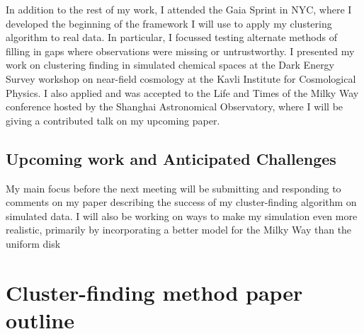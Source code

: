 \documentclass[11pt]{article}
\begin{document}
    In addition to the rest of my work, I attended the Gaia Sprint in NYC, where I developed the beginning of the framework I will use to apply my clustering algorithm to real data. In particular, I focussed testing alternate methods of filling in gaps where observations were missing or untrustworthy. I presented my work on clustering finding in simulated chemical spaces at the Dark Energy Survey workshop on near-field cosmology at the Kavli Institute for Cosmological Physics. I also applied and was accepted to the Life and Times of the Milky Way conference hosted by the Shanghai Astronomical Observatory, where I will be giving a contributed talk on my upcoming paper.
  
    
    \subsection*{Upcoming work and Anticipated Challenges}
    
    My main focus before the next meeting will be submitting and responding to comments on my paper describing the success of my cluster-finding algorithm on simulated data. I will also be working on ways to make my simulation even more realistic, primarily by incorporating a better model for the Milky Way than the uniform disk 
    
	
   
 
\section*{Cluster-finding method paper outline}
\end{document}
